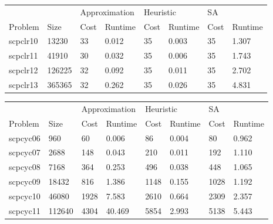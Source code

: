 \begin{table}[]
\centering
\begin{tabular}{@{}llllllll@{}}
\toprule
         &        & \multicolumn{2}{l}{Approximation} & \multicolumn{2}{l}{Heuristic} & \multicolumn{2}{l}{SA} \\
Problem  & Size   & Cost           & Runtime          & Cost         & Runtime        & Cost     & Runtime     \\ \midrule
scpclr10 & 13230  & 33             & 0.012            & 35           & 0.003          & 35       & 1.307       \\
scpclr11 & 41910  & 30             & 0.032            & 35           & 0.006          & 35       & 1.743       \\
scpclr12 & 126225 & 32             & 0.092            & 35           & 0.011          & 35       & 2.702       \\
scpclr13 & 365365 & 32             & 0.262            & 35           & 0.026          & 35       & 4.831       \\ \bottomrule
\end{tabular}
\end{table}

\begin{table}[]
\centering
\begin{tabular}{@{}llllllll@{}}
\toprule
         &        & \multicolumn{2}{l}{Approximation} & \multicolumn{2}{l}{Heuristic} & \multicolumn{2}{l}{SA} \\
Problem  & Size   & Cost           & Runtime          & Cost         & Runtime        & Cost     & Runtime     \\ \midrule
scpcyc06 & 960    & 60             & 0.006            & 86           & 0.004          & 80       & 0.962       \\
scpcyc07 & 2688   & 148            & 0.043            & 210          & 0.011          & 192      & 1.110       \\
scpcyc08 & 7168   & 364            & 0.253            & 496          & 0.038          & 448      & 1.065       \\
scpcyc09 & 18432  & 816            & 1.386            & 1148         & 0.155          & 1028     & 1.192       \\
scpcyc10 & 46080  & 1928           & 7.583            & 2610         & 0.664          & 2309     & 2.357       \\
scpcyc11 & 112640 & 4304           & 40.469           & 5854         & 2.993          & 5138     & 5.443       \\ \bottomrule
\end{tabular}
\end{table}

